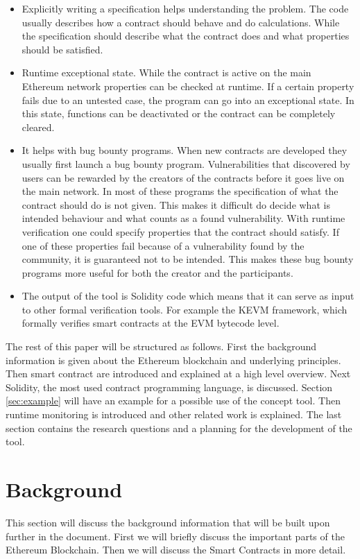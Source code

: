\documentclass[a4paper]{article}
\begin{document}
\begin{itemize}
    \item Explicitly writing a specification helps understanding the problem. The code usually describes how a contract should behave and do calculations. While the specification should describe what the contract does and what properties should be satisfied.
    \item Runtime exceptional state. While the contract is active on the main Ethereum network properties can be checked at runtime. If a certain property fails due to an untested case, the program can go into an exceptional state. In this state, functions can be deactivated or the contract can be completely cleared. 
    \item It helps with bug bounty programs. When new contracts are developed they usually first launch a bug bounty program. Vulnerabilities that discovered by users can be rewarded by the creators of the contracts before it goes live on the main network. In most of these programs the specification of what the contract should do is not given. This makes it difficult do decide what is intended behaviour and what counts as a found vulnerability. With runtime verification one could specify properties that the contract should satisfy. If one of these properties fail because of a vulnerability found by the community, it is guaranteed not to be intended. This makes these bug bounty programs more useful for both the creator and the participants. 
    \item  The output of the tool is Solidity code which means that it can serve as input to other formal verification tools. For example the KEVM framework, which formally verifies smart contracts at the EVM bytecode level. 
\end{itemize}
The rest of this paper will be structured as follows. First the background information is given about the Ethereum blockchain and underlying principles. Then smart contract are introduced and explained at a high level overview. Next Solidity, the most used contract programming language, is discussed. Section \ref{sec:example} will have an example for a possible use of the concept tool. Then runtime monitoring is introduced and other related work is explained. The last section contains the research questions and a planning for the development of the tool. 



\section{Background}
This section will discuss the background information that will be built upon further in the document. First we will briefly discuss the important parts of the Ethereum Blockchain. Then we will discuss the Smart Contracts in more detail.
\end{document}
